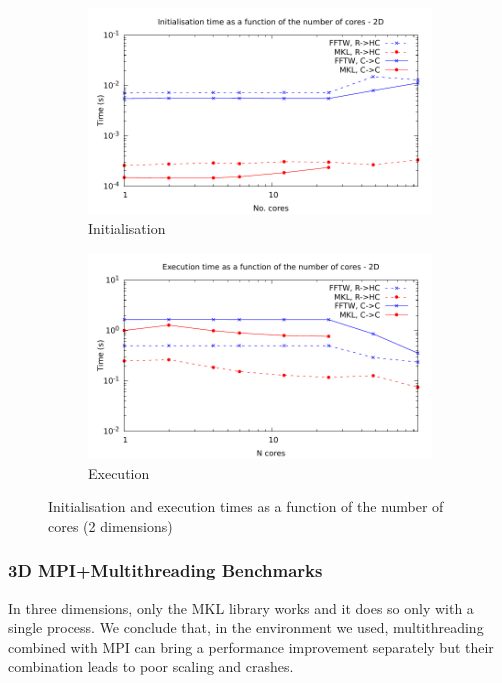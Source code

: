 \documentclass[12pt, a4paper]{article} \setlength{\textheight}{24cm}
\begin{document}
\begin{figure}[H]
  \centering
  \begin{subfigure}{.5\textwidth}
    \centering
    \includegraphics[width=.9\linewidth]{graphs/mpi-multh-init-2d.pdf}
    \caption{Initialisation}
    \label{2DMPIMULTHI}
  \end{subfigure}%
  \begin{subfigure}{.5\textwidth}
    \centering
    \includegraphics[width=.9\linewidth]{graphs/mpi-multh-exec-2d.pdf}
    \caption{Execution}
    \label{2DMPIMULTHE}
  \end{subfigure}
  \caption{Initialisation and execution times as a function of the
    number of cores (2 dimensions)}
  \label{2DMPIMULTH}
\end{figure}





\subsubsection{3D MPI+Multithreading Benchmarks}
In three dimensions, only the MKL library works and it does so only
with a single process. We conclude that, in the environment we used,
multithreading combined with MPI can bring a performance improvement
separately but their combination leads to poor scaling and crashes.
\end{document}
